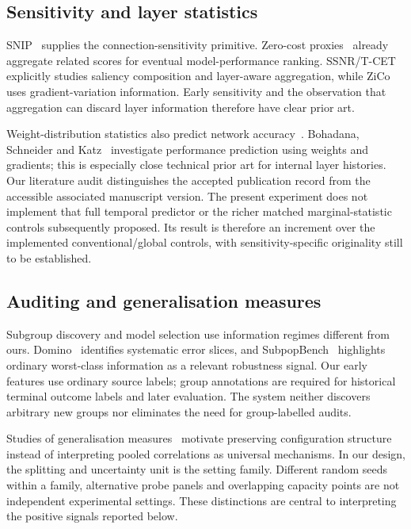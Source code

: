\documentclass[nolineno]{ieeeaccess}
\begin{document}
\subsection{Sensitivity and layer statistics}
SNIP~\cite{snip} supplies the connection-sensitivity primitive. Zero-cost proxies~\cite{zerocost} already aggregate related scores for eventual model-performance ranking. SSNR/T-CET~\cite{ssnr} explicitly studies saliency composition and layer-aware aggregation, while ZiCo~\cite{zico} uses gradient-variation information. Early sensitivity and the observation that aggregation can discard layer information therefore have clear prior art.

Weight-distribution statistics also predict network accuracy~\cite{weights}. Bohadana, Schneider and Katz~\cite{bohadana} investigate performance prediction using weights and gradients; this is especially close technical prior art for internal layer histories. Our literature audit distinguishes the accepted publication record from the accessible associated manuscript version. The present experiment does not implement that full temporal predictor or the richer matched marginal-statistic controls subsequently proposed. Its result is therefore an increment over the implemented conventional/global controls, with sensitivity-specific originality still to be established.

\subsection{Auditing and generalisation measures}
Subgroup discovery and model selection use information regimes different from ours. Domino~\cite{domino} identifies systematic error slices, and SubpopBench~\cite{subpopbench} highlights ordinary worst-class information as a relevant robustness signal. Our early features use ordinary source labels; group annotations are required for historical terminal outcome labels and later evaluation. The system neither discovers arbitrary new groups nor eliminates the need for group-labelled audits.

Studies of generalisation measures~\cite{fantastic,robustmeasures} motivate preserving configuration structure instead of interpreting pooled correlations as universal mechanisms. In our design, the splitting and uncertainty unit is the setting family. Different random seeds within a family, alternative probe panels and overlapping capacity points are not independent experimental settings. These distinctions are central to interpreting the positive signals reported below.
\end{document}
